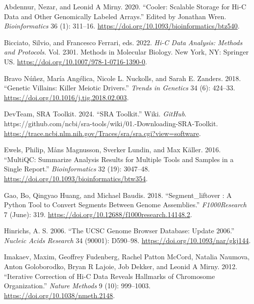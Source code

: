 \documentclass[
  11pt,
  a4paper,
]{scrbook}
\newlength{\cslhangindent}
\newenvironment{CSLReferences}[2] %
 {\begin{list}{}{%
  \setlength{\itemindent}{0pt}
  \setlength{\leftmargin}{0pt}
  \setlength{\parsep}{0pt}
  \ifodd #1
   \setlength{\leftmargin}{\cslhangindent}
   \setlength{\itemindent}{-1\cslhangindent}
  \fi
  \setlength{\itemsep}{#2\baselineskip}}}
 {\end{list}}
\let\oldemph\emph
\renewcommand\emph[1]{\oldemph{\color{gray}#1}}
\begin{document}
\label{refs}
\begin{CSLReferences}{1}{0}
Abdennur, Nezar, and Leonid A Mirny. 2020. {``Cooler: Scalable Storage
for {Hi-C} Data and Other Genomically Labeled Arrays.''} Edited by
Jonathan Wren. \emph{Bioinformatics} 36 (1): 311--16.
\url{https://doi.org/10.1093/bioinformatics/btz540}.

Bicciato, Silvio, and Francesco Ferrari, eds. 2022. \emph{Hi-{C Data
Analysis}: {Methods} and {Protocols}}. Vol. 2301. Methods in {Molecular
Biology}. New York, NY: Springer US.
\url{https://doi.org/10.1007/978-1-0716-1390-0}.

Bravo Núñez, María Angélica, Nicole L. Nuckolls, and Sarah E. Zanders.
2018. {``Genetic {Villains}: {Killer Meiotic Drivers}.''} \emph{Trends
in Genetics} 34 (6): 424--33.
\url{https://doi.org/10.1016/j.tig.2018.02.003}.

DevTeam, SRA Toolkit. 2024. {``{SRA Toolkit}.''} Wiki. \emph{GitHub}.
https://github.com/ncbi/sra-tools/wiki/01.-Downloading-SRA-Toolkit.
\url{https://trace.ncbi.nlm.nih.gov/Traces/sra/sra.cgi?view=software}.

Ewels, Philip, Måns Magnusson, Sverker Lundin, and Max Käller. 2016.
{``{MultiQC}: Summarize Analysis Results for Multiple Tools and Samples
in a Single Report.''} \emph{Bioinformatics} 32 (19): 3047--48.
\url{https://doi.org/10.1093/bioinformatics/btw354}.

Gao, Bo, Qingyao Huang, and Michael Baudis. 2018. {``Segment\_liftover :
A {Python} Tool to Convert Segments Between Genome Assemblies.''}
\emph{F1000Research} 7 (June): 319.
\url{https://doi.org/10.12688/f1000research.14148.2}.

Hinrichs, A. S. 2006. {``The {UCSC Genome Browser Database}: Update
2006.''} \emph{Nucleic Acids Research} 34 (90001): D590--98.
\url{https://doi.org/10.1093/nar/gkj144}.

Imakaev, Maxim, Geoffrey Fudenberg, Rachel Patton McCord, Natalia
Naumova, Anton Goloborodko, Bryan R Lajoie, Job Dekker, and Leonid A
Mirny. 2012. {``Iterative Correction of {Hi-C} Data Reveals Hallmarks of
Chromosome Organization.''} \emph{Nature Methods} 9 (10): 999--1003.
\url{https://doi.org/10.1038/nmeth.2148}.


\end{CSLReferences}
\end{document}
